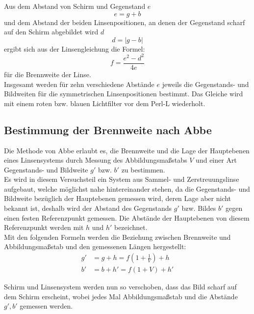 Aus dem Abstand von Schirm und Gegenstand $e$
%
\begin{equation}
  e = g + b
\end{equation} 
%
und dem Abstand der beiden Linsenpositionen, an denen der Gegenstand
scharf auf den Schirm abgebildet wird $d$ 
%
\begin{equation}
  d = |g - b|
\end{equation}
%
ergibt sich aus der Linsengleichung die Formel:
%
\begin{equation} 
\label{eq:Theorie_Bessel}
f = \frac{e^2 - d^2}{4e}
\end{equation}
%
für die Brennweite der Linse.\\
Insgesamt werden für zehn verschiedene
Abstände $e$ jeweils die Gegenstands- und Bildweiten für die
symmetrischen Linsenpositionen bestimmt.
Das Gleiche wird mit einem roten bzw. blauen Lichtfilter vor dem Perl-L wiederholt.

\subsection{Bestimmung der Brennweite nach Abbe}

Die Methode von Abbe erlaubt es, die Brennweite und die Lage der
Hauptebenen eines Linsensystems durch Messung des Abbildungsmaßstabs $V$
und einer Art Gegenstands- und Bildweite $g'$ bzw. $b'$ zu bestimmen.\\
Es wird in diesem Versuchsteil ein System aus Sammel- und Zerstreuungslinse
aufgebaut, welche möglichst nahe hintereinander stehen, da die Gegenstands- und Bildweite bezüglich der Hauptebenen gemessen wird, deren Lage aber nicht bekannt ist, deshalb wird der Abstand des Gegenstands $g'$
bzw. Bildes $b'$ gegen einen festen Referenzpunkt gemessen. Die Abstände der Hauptebenen von diesem Referenzpunkt werden mit $h$ und $h'$
bezeichnet.\\
Mit den folgenden Formeln werden die Beziehung zwischen
Brennweite und Abbildungsmaßstab und den gemessenen Längen hergestellt:
%
\begin{align}
  \label{eq:Theorie_g'}	
  g' &= g + h  = f \left(1 + \frac{1}{V}\right) + h\\
  b' &= b + h' = f (1 + V) + h'
   \label{eq:Theorie_b'}	
\end{align}

Schirm und Linsensystem werden nun so verschoben, dass das Bild
scharf auf dem Schirm erscheint, wobei jedes Mal Abbildungsmaßstab und
die Abstände $g', b'$ gemessen werden.
